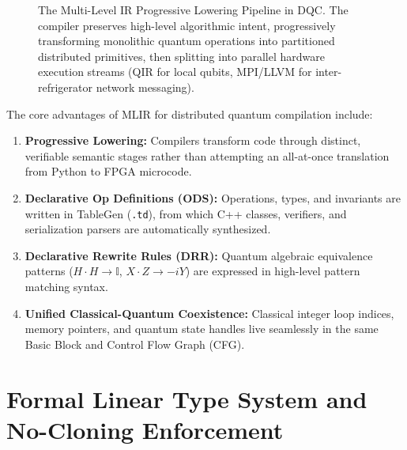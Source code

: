 \begin{figure}[htbp]
    \caption{The Multi-Level IR Progressive Lowering Pipeline in DQC. The compiler preserves high-level algorithmic intent, progressively transforming monolithic quantum operations into partitioned distributed primitives, then splitting into parallel hardware execution streams (QIR for local qubits, MPI/LLVM for inter-refrigerator network messaging).}
    \label{fig:mlir_lowering_hierarchy_ch07}
\end{figure}

The core advantages of MLIR for distributed quantum compilation include:
\begin{enumerate}
    \item \textbf{Progressive Lowering:} Compilers transform code through distinct, verifiable semantic stages rather than attempting an all-at-once translation from Python to FPGA microcode.
    \item \textbf{Declarative Op Definitions (ODS):} Operations, types, and invariants are written in TableGen (\texttt{.td}), from which C++ classes, verifiers, and serialization parsers are automatically synthesized.
    \item \textbf{Declarative Rewrite Rules (DRR):} Quantum algebraic equivalence patterns ($H \cdot H \to \mathbb{I}$, $X \cdot Z \to -iY$) are expressed in high-level pattern matching syntax.
    \item \textbf{Unified Classical-Quantum Coexistence:} Classical integer loop indices, memory pointers, and quantum state handles live seamlessly in the same Basic Block and Control Flow Graph (CFG).
\end{enumerate}

\section{Formal Linear Type System and No-Cloning Enforcement}
\label{sec:linear_type_system}

